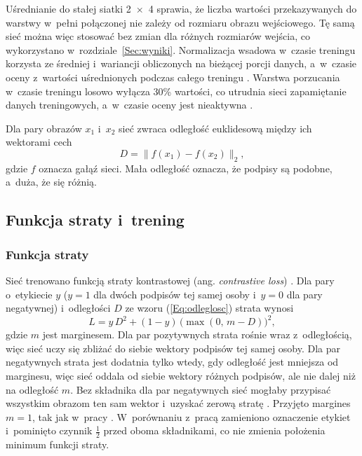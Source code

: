 \documentclass[12pt, twoside, openright]{article}
\begin{document}
Uśrednianie do stałej siatki 2~$\times$~4 sprawia, że liczba wartości przekazywanych do warstwy w~pełni połączonej nie zależy od rozmiaru obrazu wejściowego.
Tę samą sieć można więc stosować bez zmian dla różnych rozmiarów wejścia, co wykorzystano w~rozdziale~\ref{Sec:wyniki}.
Normalizacja wsadowa w~czasie treningu korzysta ze średniej i~wariancji obliczonych na bieżącej porcji danych, a~w~czasie oceny z~wartości uśrednionych podczas całego treningu \cite{ioffe2015}.
Warstwa porzucania w~czasie treningu losowo wyłącza 30\% wartości, co utrudnia sieci zapamiętanie danych treningowych, a~w~czasie oceny jest nieaktywna \cite{srivastava2014}.

Dla pary obrazów $x_1$ i~$x_2$ sieć zwraca odległość euklidesową między ich wektorami cech
\begin{equation}
	D = \lVert f(x_1) - f(x_2) \rVert_2,
	\label{Eq:odleglosc}
\end{equation}
gdzie $f$ oznacza gałąź sieci.
Mała odległość oznacza, że podpisy są podobne, a~duża, że się różnią.

\subsection{Funkcja straty i~trening}
\label{Subsec:trening}

\subsubsection*{Funkcja straty}

Sieć trenowano funkcją straty kontrastowej (ang. \textit{contrastive loss}) \cite{hadsell2006}.
Dla pary o~etykiecie $y$ ($y = 1$ dla dwóch podpisów tej samej osoby i~$y = 0$ dla pary negatywnej) i~odległości $D$ ze wzoru (\ref{Eq:odleglosc}) strata wynosi
\begin{equation}
	L = y\,D^2 + (1 - y)\,\big(\max(0,\, m - D)\big)^2,
	\label{Eq:strata}
\end{equation}
gdzie $m$ jest marginesem.
Dla par pozytywnych strata rośnie wraz z~odległością, więc sieć uczy się zbliżać do siebie wektory podpisów tej samej osoby.
Dla par negatywnych strata jest dodatnia tylko wtedy, gdy odległość jest mniejsza od marginesu, więc sieć oddala od siebie wektory różnych podpisów, ale nie dalej niż na odległość $m$.
Bez składnika dla par negatywnych sieć mogłaby przypisać wszystkim obrazom ten sam wektor i~uzyskać zerową stratę \cite{hadsell2006}.
Przyjęto margines $m = 1$, tak jak w~pracy \cite{dey2017}.
W~porównaniu z~pracą \cite{hadsell2006} zamieniono oznaczenie etykiet i~pominięto czynnik $\frac{1}{2}$ przed oboma składnikami, co nie zmienia położenia minimum funkcji straty.
\end{document}
